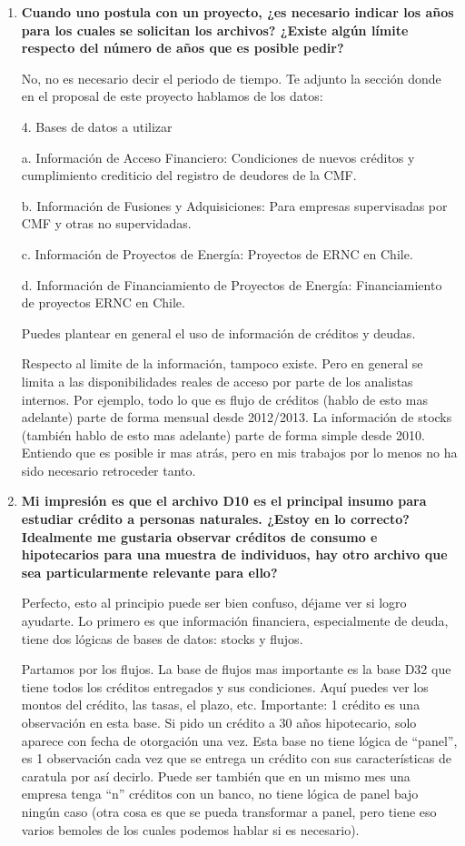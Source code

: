 \documentclass[12pt]{article}
\theoremstyle{plain}
\theoremstyle{plain}
\theoremstyle{definition}  %
\theoremstyle{remark}  %
\begin{document}
\begin{enumerate}
    \item \textbf{Cuando uno postula con un proyecto, ¿es necesario indicar los años para los cuales se solicitan los archivos? ¿Existe algún límite respecto del número de años que es posible pedir?}

    No, no es necesario decir el periodo de tiempo. Te adjunto la sección donde en el proposal de este proyecto hablamos de los datos:

4. Bases de datos a utilizar

a.      Información de Acceso Financiero: Condiciones de nuevos créditos y cumplimiento crediticio del registro de deudores de la CMF.

b.     Información de Fusiones y Adquisiciones: Para empresas supervisadas por CMF y otras no supervidadas.

c.      Información de Proyectos de Energía: Proyectos de ERNC en Chile.

d.      Información de Financiamiento de Proyectos de Energía: Financiamiento de proyectos ERNC en Chile.

Puedes plantear en general el uso de información de créditos y deudas.

Respecto al limite de la información, tampoco existe. Pero en general se limita a las disponibilidades reales de acceso por parte de los analistas internos. Por ejemplo, todo lo que es flujo de créditos (hablo de esto mas adelante) parte de forma mensual desde 2012/2013. La información de stocks (también hablo de esto mas adelante) parte de forma simple desde 2010. Entiendo que es posible ir mas atrás, pero en mis trabajos por lo menos no ha sido necesario retroceder tanto.



\item \textbf{Mi impresión es que el archivo D10 es el principal insumo para estudiar crédito a personas naturales. ¿Estoy en lo correcto? Idealmente me gustaria observar créditos de consumo e hipotecarios para una muestra de individuos, hay otro archivo que sea particularmente relevante para ello?}

Perfecto, esto al principio puede ser bien confuso, déjame ver si logro ayudarte. Lo primero es que información financiera, especialmente de deuda, tiene dos lógicas de bases de datos: stocks y flujos.

Partamos por los flujos. La base de flujos mas importante es la base D32 que tiene todos los créditos entregados y sus condiciones. Aquí puedes ver los montos del crédito, las tasas, el plazo, etc. Importante: 1 crédito es una observación en esta base. Si pido un crédito a 30 años hipotecario, solo aparece con fecha de otorgación una vez. Esta base no tiene lógica de “panel”, es 1 observación cada vez que se entrega un crédito con sus características de caratula por así decirlo. Puede ser también que en un mismo mes una empresa tenga “n” créditos con un banco, no tiene lógica de panel bajo ningún caso (otra cosa es que se pueda transformar a panel, pero tiene eso varios bemoles de los cuales podemos hablar si es necesario).


\end{enumerate}
\end{document}
